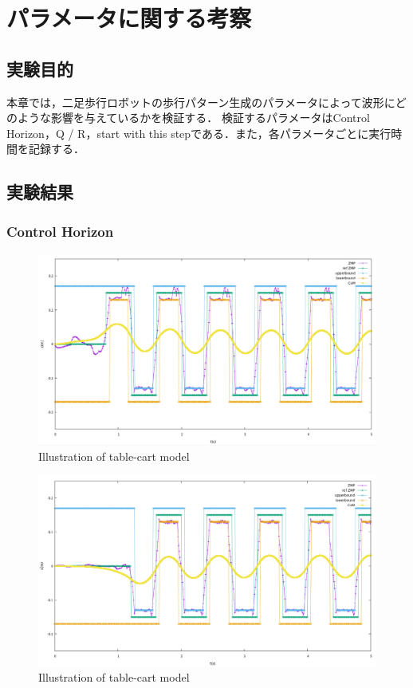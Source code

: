 \chapter{パラメータに関する考察}
\section{実験目的}
本章では，二足歩行ロボットの歩行パターン生成のパラメータによって波形にどのような影響を与えているかを検証する．
検証するパラメータはControl Horizon，Q / R，start with this stepである．また，各パラメータごとに実行時間を記録する．

\section{実験結果}

\subsection{Control Horizon}
\begin{figure}[H]
  \centering
 \includegraphics[keepaspectratio, scale=0.25]
      {images/mpc_horizon/mpc_horizon_100.png}
 \caption{Illustration of table-cart model}
 \label{Fig:Illustration of table-cart model}
\end{figure}

\begin{figure}[H]
  \centering
 \includegraphics[keepaspectratio, scale=0.25]
      {images/mpc_horizon/mpc_horizon_150.png}
 \caption{Illustration of table-cart model}
 \label{Fig:Illustration of table-cart model}
\end{figure}

